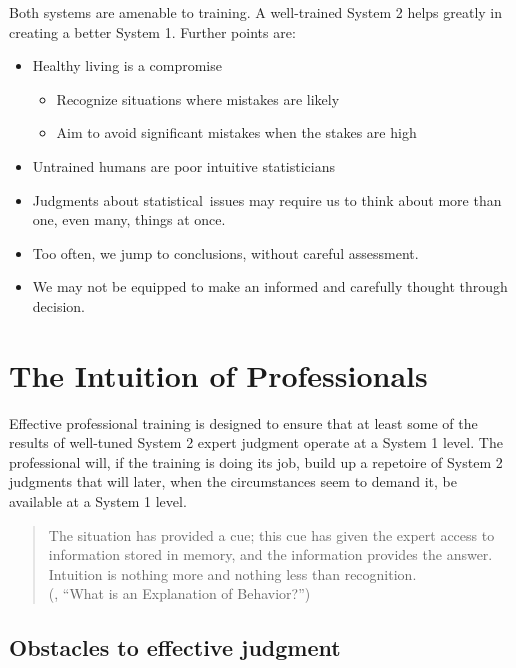 \documentclass[
  10ptls,
  b5paper]{book}
\providecommand{\tightlist}{%
  \setlength{\itemsep}{0pt}\setlength{\parskip}{0pt}}
\begin{document}
Both systems are amenable to training. A well-trained System 2 helps
greatly in creating a better System 1. Further points are:

\begin{itemize}
\tightlist
\item
  Healthy living is a compromise

  \begin{itemize}
  \tightlist
  \item
    Recognize situations where mistakes are likely
  \item
    Aim to avoid significant mistakes when the stakes are high
  \end{itemize}
\item
  Untrained humans are poor intuitive statisticians
\item
  Judgments about statistical~issues may require us to think about more than one, even many, things at once.
\item
  Too often, we jump to conclusions, without careful assessment.
\item
  We may not be equipped to make an informed and carefully thought through decision.
\end{itemize}

\section{The Intuition of Professionals}\label{the-intuition-of-professionals}

Effective professional training is designed to ensure that at least some of the results of well-tuned System 2 expert judgment operate at a System 1 level.
The professional will, if the training is doing its job, build up a
repetoire of System 2 judgments that will later, when the circumstances
seem to demand it, be available at a System 1 level.

\begin{quote}
The situation has provided a cue; this cue has given the expert access to information stored in memory, and the information provides the answer. Intuition is nothing more and nothing less than recognition.\\
(, ``What is an Explanation of Behavior?'')
\end{quote}

\subsection*{Obstacles to effective judgment}\label{obstacles-to-effective-judgment}
\end{document}
